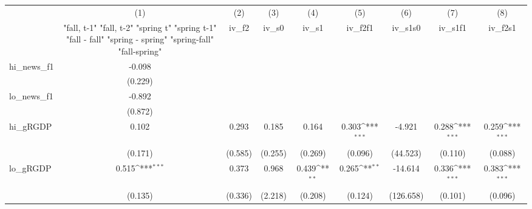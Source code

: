 {
\def\sym#1{\ifmmode^{#1}\else\(^{#1}\)\fi}
\begin{tabular}{l*{8}{c}}
\toprule
            &\multicolumn{1}{c}{(1)}&\multicolumn{1}{c}{(2)}&\multicolumn{1}{c}{(3)}&\multicolumn{1}{c}{(4)}&\multicolumn{1}{c}{(5)}&\multicolumn{1}{c}{(6)}&\multicolumn{1}{c}{(7)}&\multicolumn{1}{c}{(8)}\\
            &\multicolumn{1}{c}{  "fall, t-1" "fall, t-2" "spring t" "spring t-1"  "fall - fall" "spring - spring" "spring-fall" "fall-spring" }&\multicolumn{1}{c}{iv\_f2}&\multicolumn{1}{c}{iv\_s0}&\multicolumn{1}{c}{iv\_s1}&\multicolumn{1}{c}{iv\_f2f1}&\multicolumn{1}{c}{iv\_s1s0}&\multicolumn{1}{c}{iv\_s1f1}&\multicolumn{1}{c}{iv\_f2s1}\\
\midrule
hi\_news\_f1  &      -0.098         &                     &                     &                     &                     &                     &                     &                     \\
            &     (0.229)         &                     &                     &                     &                     &                     &                     &                     \\
\addlinespace
lo\_news\_f1  &      -0.892         &                     &                     &                     &                     &                     &                     &                     \\
            &     (0.872)         &                     &                     &                     &                     &                     &                     &                     \\
\addlinespace
hi\_gRGDP    &       0.102         &       0.293         &       0.185         &       0.164         &       0.303\sym{***}&      -4.921         &       0.288\sym{***}&       0.259\sym{***}\\
            &     (0.171)         &     (0.585)         &     (0.255)         &     (0.269)         &     (0.096)         &    (44.523)         &     (0.110)         &     (0.088)         \\
\addlinespace
lo\_gRGDP    &       0.515\sym{***}&       0.373         &       0.968         &       0.439\sym{**} &       0.265\sym{**} &     -14.614         &       0.336\sym{***}&       0.383\sym{***}\\
            &     (0.135)         &     (0.336)         &     (2.218)         &     (0.208)         &     (0.124)         &   (126.658)         &     (0.101)         &     (0.096)         \\

\end{tabular}}
